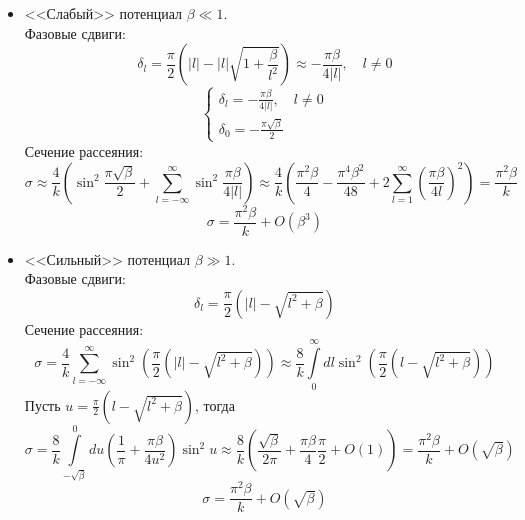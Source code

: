 \documentclass[12pt]{article}
\theoremstyle{definition}
\begin{document}
\begin{itemize}
    \item <<Слабый>> потенциал $\beta\ll1$.\\
    Фазовые сдвиги:
    \begin{equation}
        \delta_l=\frac{\pi}{2}\left(|l|-|l|\sqrt{1+\frac{\beta}{l^2}}\right)\approx-\frac{\pi\beta}{4|l|},\quad l\neq0
    \end{equation}
    \begin{equation}
        \boxed{\begin{cases}
            \delta_l=-\frac{\pi\beta}{4|l|},\quad l\neq0\\
            \delta_0=-\frac{\pi\sqrt{\beta}}{2}
        \end{cases}}
    \end{equation}
    Сечение рассеяния:
    \begin{equation}
        \sigma\approx\frac{4}{k}\left(\sin^2\frac{\pi\sqrt{\beta}}{2}+\sum\limits_{l=-\infty}^{\infty}\sin^2\frac{\pi\beta}{4|l|}\right)\approx\frac{4}{k}\left(\frac{\pi^2\beta}{4}-\frac{\pi^4\beta^2}{48}+2\sum\limits_{l=1}^\infty\left(\frac{\pi\beta}{4l}\right)^2\right)=\frac{\pi^2\beta}{k}
    \end{equation}
    \begin{equation}
        \boxed{\sigma=\frac{\pi^2\beta}{k}+O(\beta^3)}
    \end{equation}
    \item <<Сильный>> потенциал $\beta\gg1$.\\
    Фазовые сдвиги:
    \begin{equation}
        \boxed{\delta_l=\frac{\pi}{2}(|l|-\sqrt{l^2+\beta})}
    \end{equation}
    Сечение рассеяния:
    \begin{equation}
        \sigma=\frac{4}{k}\sum\limits_{l=-\infty}^{\infty}\sin^2\left(\frac{\pi}{2}(|l|-\sqrt{l^2+\beta})\right)\approx\frac{8}{k}\int\limits_{0}^{\infty}dl\sin^2\left(\frac{\pi}{2}(l-\sqrt{l^2+\beta})\right)
    \end{equation}
    Пусть $u=\frac{\pi}{2}(l-\sqrt{l^2+\beta})$, тогда
    \begin{equation}
        \sigma=\frac{8}{k}\int\limits_{-\sqrt{\beta}}^0 du\left(\frac{1}{\pi}+\frac{\pi\beta}{4u^2}\right)\sin^2u\approx\frac{8}{k}\left(\frac{\sqrt{\beta}}{2\pi}+\frac{\pi\beta}{4}\frac{\pi}{2}+O(1)\right)=\frac{\pi^2\beta}{k}+O(\sqrt{\beta})
    \end{equation}
    \begin{equation}
        \boxed{\sigma=\frac{\pi^2\beta}{k}+O(\sqrt{\beta})}
    \end{equation}
\end{itemize}
\end{document}
